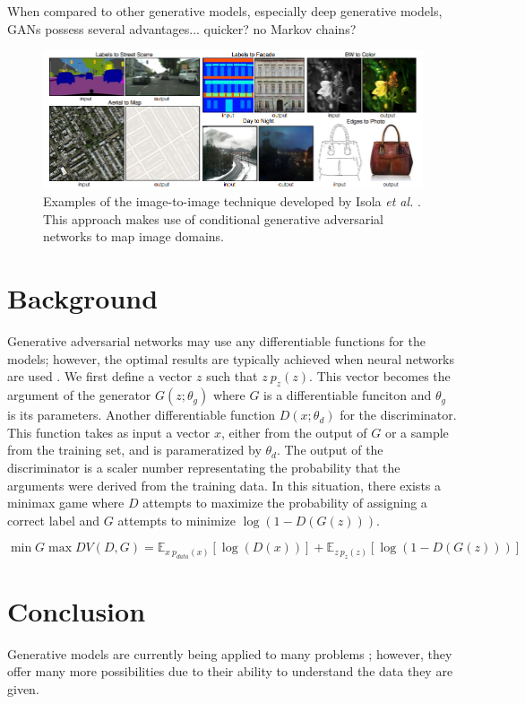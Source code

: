 \documentclass[11pt]{article}
\begin{document}
When compared to other generative models, especially deep generative models, GANs possess several advantages... quicker? no Markov chains?

\begin{figure}
\centering
\includegraphics[scale=0.65]{img2img}
\caption{Examples of the image-to-image technique developed by Isola \textit{et al.} \citep{2016arXiv161107004I}. This approach makes use of conditional generative adversarial networks to map image domains.}
\label{fig:Image to Image Examples}
\end{figure}

\section{Background}
Generative adversarial networks may use any differentiable functions for the models; however, the optimal results are typically achieved when neural networks are used \citep{2014arXiv1406.2661G}. We first define a vector $z$ such that $z~p_z(z)$. This vector becomes the argument of the generator $G(z;\theta_g)$ where $G$ is a differentiable funciton and $\theta_g$ is its parameters. Another differentiable function $D(x;\theta_d)$ for the discriminator. This function takes as input a vector $x$, either from the output of $G$ or a sample from the training set, and is parameratized by $\theta_d$. The output of the discriminator is a scaler number representating the probability that the arguments were derived from the training data. In this situation, there exists a minimax game where $D$ attempts to maximize the probability of assigning a correct label and $G$ attempts to minimize $\log(1-D(G(z)))$.

$$\min{G}\max{D}V(D, G) = \mathbb{E}_{x~p_{data}(x)}[\log(D(x))] + \mathbb{E}_{z~p_z(z)}[\log(1-D(G(z)))]$$

\section{Conclusion}
Generative models are currently being applied to many problems \citep{genmodelingopenai}; however, they offer many more possibilities due to their ability to understand the data they are given.



\end{document}
